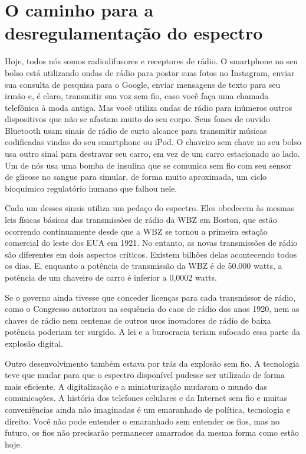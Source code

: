 \documentclass{book}
\begin{document}
\section{O caminho para a desregulamentação do espectro}
\label{cap8:os-caminho}
Hoje, todos nós somos radiodifusores e receptores de rádio. O smartphone no seu
bolso está utilizando ondas de rádio para postar suas fotos no Instagram, enviar
sua consulta de pesquisa para o Google, enviar mensagens de texto para seu irmão
e, é claro, transmitir sua voz sem fio, caso você faça uma chamada telefônica à
moda antiga. Mas você utiliza ondas de rádio para inúmeros outros dispositivos
que não se afastam muito do seu corpo. Seus fones de ouvido Bluetooth usam sinais
de rádio de curto alcance para transmitir músicas codificadas vindas do seu
smartphone ou iPod. O chaveiro sem chave no seu bolso usa outro sinal para
destravar seu carro, em vez de um carro estacionado ao lado. Um de nós usa uma
bomba de insulina que se comunica sem fio com seu sensor de glicose no sangue
para simular, de forma muito aproximada, um ciclo bioquímico regulatório humano
que falhou nele.

Cada um desses sinais utiliza um pedaço do espectro. Eles obedecem às mesmas leis
físicas básicas das transmissões de rádio da WBZ em Boston, que estão ocorrendo
continuamente desde que a WBZ se tornou a primeira estação comercial do leste
dos EUA em 1921. No entanto, as novas transmissões de rádio são diferentes em
dois aspectos críticos. Existem bilhões delas acontecendo todos os dias. E,
enquanto a potência de transmissão da WBZ é de 50.000 watts, a potência de um
chaveiro de carro é inferior a 0,0002 watts.

Se o governo ainda tivesse que conceder licenças para cada transmissor de rádio,
como o Congresso autorizou na sequência do caos de rádio dos anos 1920, nem as
chaves de rádio nem centenas de outros usos inovadores de rádio de baixa potência
poderiam ter surgido. A lei e a burocracia teriam sufocado essa parte da explosão
digital.

Outro desenvolvimento também estava por trás da explosão sem fio. A tecnologia
teve que mudar para que o espectro disponível pudesse ser utilizado de forma mais
eficiente. A digitalização e a miniaturização mudaram o mundo das comunicações.
A história dos telefones celulares e da Internet sem fio e muitas conveniências
ainda não imaginadas é um emaranhado de política, tecnologia e direito. Você não
pode entender o emaranhado sem entender os fios, mas no futuro, os fios não
precisarão permanecer amarrados da mesma forma como estão hoje.
\end{document}
